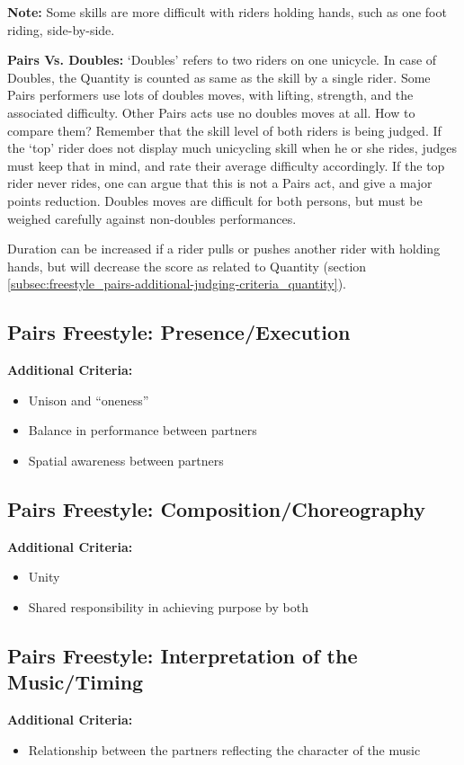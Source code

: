 \textbf{Note:} Some skills are more difficult with riders holding hands, such as one foot riding, side-by-side.

\textbf{Pairs Vs. Doubles:} `Doubles' refers to two riders on one unicycle.
In case of Doubles, the Quantity is counted as same as the skill by a single rider.
Some Pairs performers use lots of doubles moves, with lifting, strength, and the associated difficulty.
Other Pairs acts use no doubles moves at all.
How to compare them? Remember that the skill level of both riders is being judged.
If the `top' rider does not display much unicycling skill when he or she rides, judges must keep that in mind, and rate their average difficulty accordingly.
If the top rider never rides, one can argue that this is not a Pairs act, and give a major points reduction.
Doubles moves are difficult for both persons, but must be weighed carefully against non-doubles performances.

Duration can be increased if a rider pulls or pushes another rider with holding hands, but will decrease the score as related to Quantity (section \ref{subsec:freestyle_pairs-additional-judging-criteria_quantity}).

\subsection{Pairs Freestyle: Presence/Execution}
\textbf{Additional Criteria:}
\begin{itemize}
\item Unison and ``oneness''
\item Balance in performance between partners
\item Spatial awareness between partners
\end{itemize}

\subsection{Pairs Freestyle: Composition/Choreography}
\textbf{Additional Criteria:}
\begin{itemize}
\item Unity
\item Shared responsibility in achieving purpose by both
\end{itemize}

\subsection{Pairs Freestyle: Interpretation of the Music/Timing}
\textbf{Additional Criteria:}
\begin{itemize}
\item Relationship between the partners reflecting the character of the music
\end{itemize}

